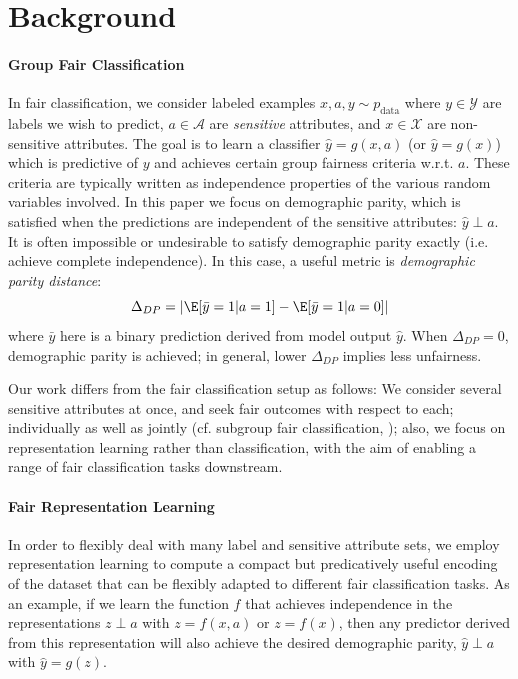 \section{Background} \label{sec:background}
\paragraph{Group Fair Classification}
In fair classification, we consider labeled examples $x, a, y \sim p_{\text{data}}$ where $y \in \mathcal{Y}$ are labels we wish to predict, $a \in \mathcal{A}$ are \emph{sensitive} attributes, and $x \in \mathcal{X}$ are non-sensitive attributes. 
The goal is to learn a classifier $\hat y = g(x, a)$ (or $\hat y = g(x)$) which is predictive of $y$ and achieves certain group fairness criteria w.r.t. $a$.
These criteria are typically written as independence properties of the various random variables involved.
In this paper we focus on demographic parity, which is satisfied when the predictions are independent of the sensitive attributes: $\hat y \perp a$.
It is often impossible or undesirable to satisfy demographic parity exactly (i.e. achieve complete independence).
In this case, a useful metric is \textit{demographic parity distance}:
\begin{equation}
    \Delta_{DP} = | \E [\bar y = 1 | a = 1] - \E [\bar y = 1 | a = 0] |
\end{equation}
where $\bar y$ here is a binary prediction derived from model output $\hat y$.
When $\Delta_{DP}=0$, demographic parity is achieved; in general, lower $\Delta_{DP}$ implies less unfairness.

Our work differs from the fair classification setup as follows:
We consider several sensitive attributes at once, and seek fair outcomes with respect to each; individually as well as jointly (cf. subgroup fair classification, \citet{kearns2017preventing,johnson2018multicalibration});
also, we focus on representation learning rather than classification, with the aim of enabling a range of fair classification tasks downstream.

\paragraph{Fair Representation Learning}
In order to flexibly deal with many label and sensitive attribute sets, we employ representation learning to compute a compact but predicatively useful encoding of the dataset that can be flexibly adapted to different fair classification tasks.
As an example, if we learn the function $f$ that achieves independence in the representations $z \perp a$ with $z=f(x, a)$ or $z=f(x)$, then any predictor derived from this representation will also achieve the desired demographic parity, $\hat y \perp a$ with $\hat y = g(z)$.

